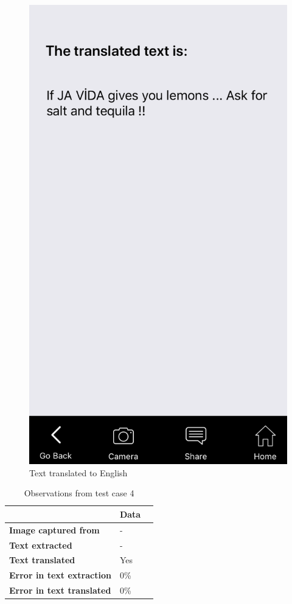 \documentclass[12pt]{article}
\begin{document}
       \begin{figure}[H]
	\centering
	\includegraphics[width=0.5\linewidth]{media/case4b.png}
	\caption{Text translated to English}
	\label{fig:engs}
\end{figure} 

\begin{table}%
    \centering
    \caption{Observations from test case 4} 
    \label{my-label4}
       \begin{tabular}{|p{30mm}|p{35mm}|p{35mm}|}
 \hline
  & \textbf{Data}  \\ [0.5ex] 
 \hline\hline
 \textbf{Image captured from} & -  \\
 \hline
  \textbf{Text extracted} & -  \\
 \hline
 \textbf{Text translated} & Yes   \\
 \hline
 \textbf{Error in text extraction} & 0\%   \\
 \hline
 \textbf{Error in text translated} & 0\%   \\ [1ex] 
 \hline
    \end{tabular}
\end{table}
\end{document}
